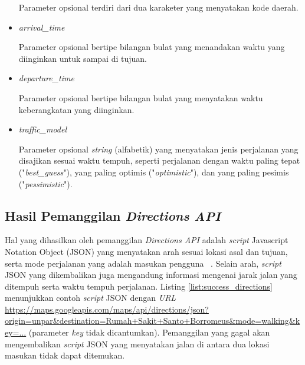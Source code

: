 \begin{itemize}
	Parameter opsional terdiri dari dua karaketer yang menyatakan kode daerah.
	\item \textit{arrival\_time} 
	
	Parameter opsional bertipe bilangan bulat yang menandakan waktu yang diinginkan untuk sampai di tujuan.
	\item \textit{departure\_time} 
	
	Parameter opsional bertipe bilangan bulat yang menyatakan waktu keberangkatan yang diinginkan.
	\item \textit{traffic\_model}
	
	Parameter opsional \textit{string} (alfabetik) yang menyatakan jenis perjalanan yang disajikan sesuai waktu tempuh, seperti perjalanan dengan waktu paling tepat ("\textit{best\_guess}"), yang paling optimis ("\textit{optimistic}"), dan yang paling pesimis ("\textit{pessimistic}").
	
\end{itemize}


\subsection{Hasil Pemanggilan \textit{Directions API}}
Hal yang dihasilkan oleh pemanggilan \textit{Directions API} adalah \textit{script} Javascript Notation Object (JSON) yang menyatakan arah sesuai lokasi asal dan tujuan, serta mode perjalanan yang adalah masukan pengguna ~\cite{directions-api}. Selain arah, \textit{script} JSON yang dikembalikan juga mengandung informasi mengenai jarak jalan yang ditempuh serta waktu tempuh perjalanan. Listing \ref{list:success_directions} menunjukkan contoh \textit{script} JSON dengan \textit{URL} \url{https://maps.googleapis.com/maps/api/directions/json?origin=unpar&destination=Rumah+Sakit+Santo+Borromeus&mode=walking&key=...} (parameter \textit{key} tidak dicantumkan). Pemanggilan yang gagal akan mengembalikan \textit{script} JSON yang menyatakan jalan di antara dua lokasi masukan tidak dapat ditemukan.



